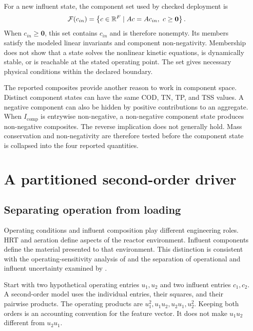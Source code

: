 For a new influent state, the component set used by checked deployment is
\begin{equation}
\equationname{Structured-regression feasible set for mass conservation and non-negativity}
\label{eq:icsor_feasible_set}
\mathcal{F}(c_{in})=
\left\{c\in\mathbb{R}^{F}\mid Ac=Ac_{in},\ c\geq\mathbf{0}\right\}.
\end{equation}
When \(c_{in}\geq\mathbf{0}\), this set contains \(c_{in}\) and is therefore nonempty. Its members satisfy the modeled linear invariants and component non-negativity. Membership does not show that a state solves the nonlinear kinetic equations, is dynamically stable, or is reachable at the stated operating point. The set gives necessary physical conditions within the declared boundary.

The reported composites provide another reason to work in component space. Distinct component states can have the same COD, TN, TP, and TSS values. A negative component can also be hidden by positive contributions to an aggregate. When \(I_{\mathrm{comp}}\) is entrywise non-negative, a non-negative component state produces non-negative composites. The reverse implication does not generally hold. Mass conservation and non-negativity are therefore tested before the component state is collapsed into the four reported quantities.

\section{A partitioned second-order driver}

\subsection{Separating operation from loading}

Operating conditions and influent composition play different engineering roles. HRT and aeration define aspects of the reactor environment. Influent components define the material presented to that environment. This distinction is consistent with the operating-sensitivity analysis of \citet{Araujo2013} and the separation of operational and influent uncertainty examined by \citet{Machado2014}.

Start with two hypothetical operating entries \(u_1,u_2\) and two influent entries \(c_1,c_2\). A second-order model uses the individual entries, their squares, and their pairwise products. The operating products are \(u_1^2,u_1u_2,u_2u_1,u_2^2\). Keeping both orders is an accounting convention for the feature vector. It does not make \(u_1u_2\) different from \(u_2u_1\).

